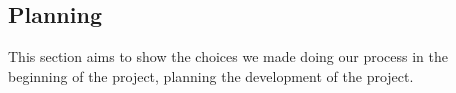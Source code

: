 \subsection{Planning}
This section aims to show the choices we made doing our process in the beginning of the project, planning the development of the project.






\newpage